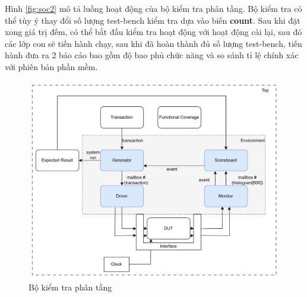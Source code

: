 Hình \ref{fig:soc2} mô tả luồng hoạt động của bộ kiểm tra phân tầng. Bộ kiểm tra có thể tùy ý thay đổi số lượng test-bench kiểm tra dựa vào biến \textbf{count}. Sau khi đặt xong giá trị đếm, có thể bắt đầu kiểm tra hoạt động với hoạt động cài lại, sau đó các lớp con sẽ tiến hành chạy, sau khi đã hoàn thành đủ số lượng test-bench, tiến hành đưa ra 2 báo cáo bao gồm độ bao phủ chức năng và so sánh tỉ lệ chính xác với phiên bản phần mềm.
\begin{figure}[!ht]
	\centering
	\includegraphics[width=\linewidth]{figures/myLayeredtb.png}
	\caption{Bộ kiểm tra phân tầng}
	\label{fig:myLayeredtb}
\end{figure}

